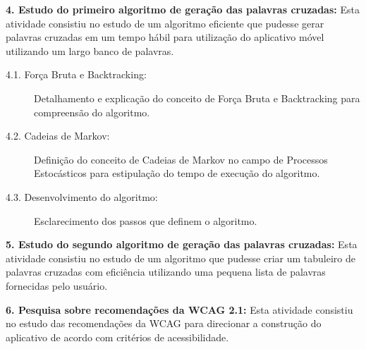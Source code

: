 \begin{description}

\item \textbf{4. Estudo do primeiro algoritmo de geração das palavras cruzadas:}
Esta atividade consistiu no estudo de um algoritmo eficiente que pudesse gerar palavras cruzadas em um tempo hábil para utilização do aplicativo móvel utilizando um largo banco de palavras.
 

\begin{description}
\item[4.1. Força Bruta e Backtracking:] Detalhamento e explicação do conceito de Força Bruta e Backtracking para compreensão do algoritmo.

\item[4.2. Cadeias de Markov:] Definição do conceito de Cadeias de Markov no campo de Processos Estocásticos para estipulação do tempo de execução do algoritmo.

\item[4.3. Desenvolvimento do algoritmo:] Esclarecimento dos passos que definem o algoritmo.

\end{description}

\item \textbf{5. Estudo do segundo algoritmo de geração das palavras cruzadas:}
Esta atividade consistiu no estudo de um algoritmo que pudesse criar um tabuleiro de palavras cruzadas com eficiência utilizando uma pequena lista de palavras fornecidas pelo usuário.

\item \textbf{6. Pesquisa sobre recomendações da WCAG 2.1:}
Esta atividade consistiu no estudo das recomendações da WCAG para direcionar a construção do aplicativo de acordo com critérios de acessibilidade.

\end{description}